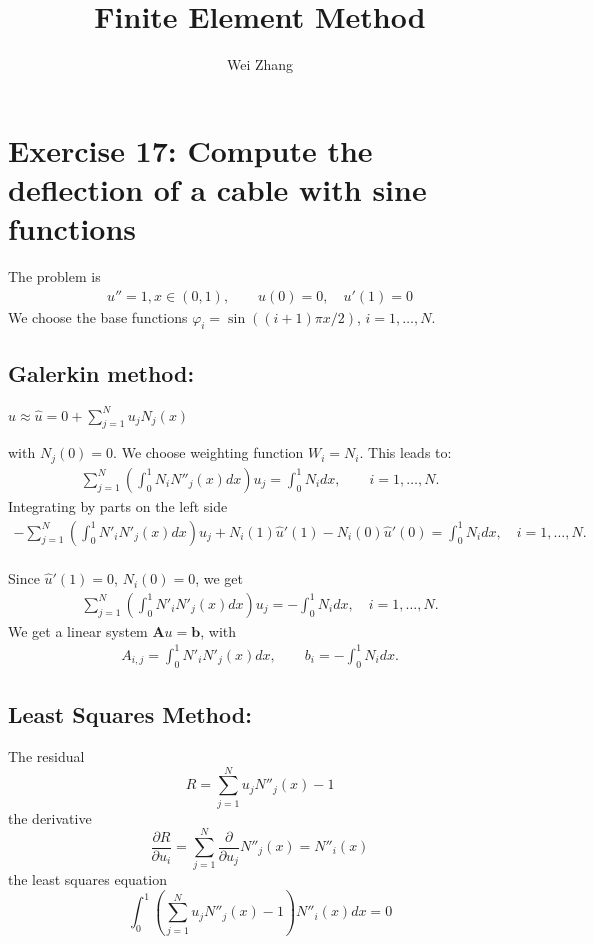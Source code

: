 \documentclass{article}
\begin{document}
\title{Finite Element Method}
\author{Wei Zhang}
\large
\maketitle


\section{Exercise 17: Compute the deflection of a cable with sine functions}
The problem is
\begin{gather}
u''=1, x\in(0, 1), \qquad  u(0)=0, \quad u'(1)=0
\end{gather}
We choose the base functions $\varphi_{i}=\sin((i+1)\pi x/2)$, $i=1, \ldots, N.$\\
\subsection{Galerkin method:}
\begin{center}
$u\approx \hat{u}=0+\displaystyle \sum^{N}_{j=1}u_{j}N_{j}(x)$
\end{center}
with $N_{j}(0)=0$. We choose weighting function $W_{i}=N_{i}$. This leads to:
\begin{gather}
\displaystyle \sum^{N}_{j=1}\left(\int^{1}_{0} N_{i}N''_{j}(x)dx\right)u_{j}=\int^{1}_{0} N_{i}dx, \qquad i=1, \ldots, N.
\end{gather}
Integrating by parts on the left side
\begin{gather}
\displaystyle -\sum^{N}_{j=1}\left(\int^{1}_{0} N'_{i}N'_{j}(x)dx\right)u_{j}+N_{i}(1)\hat{u}'(1)-N_{i}(0)\hat{u}'(0)=\int^{1}_{0} N_{i}dx, \quad i=1, \ldots, N.
\end{gather}\\
Since $\hat{u}'(1)=0$, $N_{i}(0)=0$, we get
\begin{gather}
\displaystyle \sum^{N}_{j=1}\left(\int^{1}_{0} N'_{i}N'_{j}(x)dx\right)u_{j}=-\int^{1}_{0} N_{i}dx, \quad i=1, \ldots, N.
\end{gather}
We get a linear system $\textbf{A}u=\textbf{b}$, with
\begin{gather}
 A_{i,j}=\displaystyle\int^{1}_{0}N'_{i}N'_{j}(x)dx, \qquad
\displaystyle b_{i}=-\int^{1}_{0} N_{i}dx.
\end{gather}
\subsection{Least Squares Method:}
The residual
\begin{equation}
R=\displaystyle \sum^{N}_{j=1}u_{j}N''_{j}(x)-1
\end{equation}
the derivative
\begin{equation}
\displaystyle \frac{\partial R}{\partial u_{i}}= \sum^{N}_{j=1}\frac{\partial}{\partial u_{j}}N''_{j}(x)=N''_{i}(x)
\end{equation}
the least squares equation
\begin{equation*}
\displaystyle  \int^{1}_{0}\left(\sum^{N}_{j=1}u_{j}N''_{j}(x)-1\right)N''_{i}(x)dx=0
\end{equation*}
\end{document}
